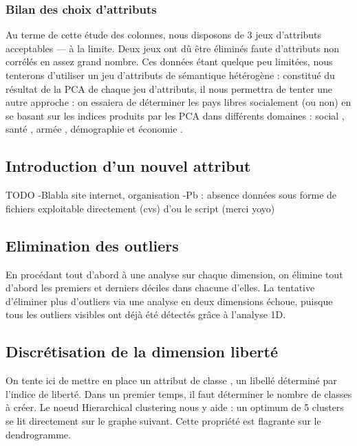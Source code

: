 \subsubsection{Bilan des choix d'attributs}
Au terme de cette étude des colonnes, nous disposons de 3 jeux d'attributs acceptables --- à la limite. Deux jeux ont dû être éliminés faute d'attributs non corrélés en assez grand nombre. Ces données étant quelque peu limitées, nous tenterons d'utiliser un jeu d'attributs de sémantique hétérogène : constitué du résultat de la PCA de chaque jeu d'attributs, il nous permettra de tenter une autre approche : on essaiera de déterminer les pays libres socialement (ou non) en se basant sur les indices produits par les PCA dans différents domaines : \og social \fg, \og santé \fg, \og armée \fg, \og démographie \fg et \og économie \fg.


\subsection{Introduction d'un nouvel attribut}
{\huge TODO}
-Blabla site internet, organisation
-Pb : absence données sous forme de fichiers exploitable directement (cvs) d'ou le script (merci yoyo)

\subsection{Elimination des outliers}
En procédant tout d'abord à une analyse sur chaque dimension, on élimine tout d'abord les premiers et derniers déciles dans chacune d'elles.
La tentative d'éliminer plus d'outliers via une analyse en deux dimensions échoue, puisque tous les outliers visibles ont déjà été détectés grâce à l'analyse 1D.

\subsection{Discrétisation de la dimension \og liberté \fg}
On tente ici de mettre en place un attribut de \og classe \fg, un libellé déterminé par l'indice de liberté. Dans un premier temps, il faut déterminer le nombre de classes à créer. Le noeud \og Hierarchical clustering \fg nous y aide : un optimum de 5 clusters se lit directement sur le graphe suivant.
Cette propriété est flagrante sur le dendrogramme.

